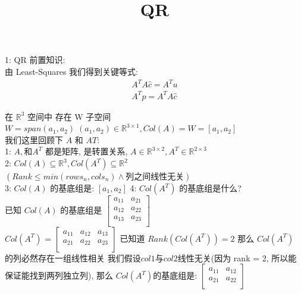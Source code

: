 \documentclass[12pt]{article}
\title{QR}
\date{}
\begin{document}
\maketitle
\begin{flushleft}

    1: QR 前置知识: \\
    由 Least-Squares 我们得到关键等式: \\
    \begin{align}
        A^{T}A\hat{c} = A^{T}u \\
        A^{T}p = A^{T}A\hat{c}
    \end{align}

    在 $\mathbb{R}^{3}$ 空间中 存在 W 子空间 $W = span(a_1,a_2)\; (a_1, a_2) \in \mathbb{R}^{3 \times 1}, Col(A) = W = [a_1, a_2]$ \\

    我们这里回顾下 $A$ 和 $A{T}$: \\
    1: $A, 和 A^{T}$ 都是矩阵, 是转置关系, $A \in \mathbb{R}^{3 \times 2}, A^{T} \in \mathbb{R}^{2 \times 3}$ \\
    2: $Col(A) \subseteq \mathbb{R}^{3}, Col(A^{T}) \subseteq \mathbb{R}^{2}$ $(Rank \leq min(rows_n,cols_n) \land \text{列之间线性无关})$ \\
    3: $Col(A)$ 的基底组是: $[a_1, a_2]$
    4: $Col(A^{T})$ 的基底组是什么?  \\
    已知 $Col(A)$ 的基底组是 $\begin{bmatrix}
            a_{11} & a_{21} \\
            a_{12} & a_{22} \\
            a_{13} & a_{23} \\
        \end{bmatrix}$ \\
    $Col(A^{T})$ = $\begin{bmatrix}
            a_{11} & a_{12} & a_{13} \\
            a_{21} & a_{22} & a_{23} \\
        \end{bmatrix}$
    已知道 $Rank(Col(A^{T})) = 2$ 那么 $Col(A^{T})$ 的列必然存在一组线性相关
    我们假设$col1$与$col2$线性无关(因为 rank = 2, 所以能保证能找到两列独立列),
    那么 $Col(A^{T})$的基底组是: $\begin{bmatrix}
            a_{11} & a_{12} \\
            a_{21} & a_{22} \\
        \end{bmatrix}$


\end{flushleft}
\end{document}
